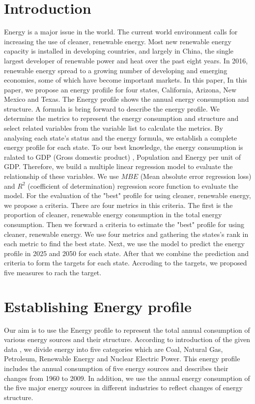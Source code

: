\documentclass{mcmthesis}
\begin{document}
\section{Introduction}
Energy is a major issue in the world. The current world environment calls for increasing the use of cleaner, renewable energy.
Most new renewable energy capacity is installed in developing
countries, and largely in China, the single largest developer of
renewable power and heat over the past eight years. In 2016,
renewable energy spread to a growing number of developing and
emerging economies, some of which have become important
markets.
In this paper, In this paper, we propose an energy profiile for four states, California, Arizona, New Mexico and Texas. The Energy profile shows the annual energy consumption and structure.
A formula is bring forward to describe the energy profile. We determine the metrics to represent the energy consumption and structure and select related variables from the variable list to calculate the metrics.
By analysing each state's status and the energy formula, we establish a complete energy profile for each state.
To our best knowledge, the energy consumption is ralated to
GDP (Gross domestic product) , Population and Energy per unit of GDP. Therefore, we build a multiple linear regression model to evaluate the relationship of these variables.
We use $MBE$ (Mean absolute error regression loss) and $R^2$ (coefficient of determination) regression score function to evaluate the model.
For the evaluation of the "best" profile for using cleaner, renewable energy, we propose a criteria. There are four metrics in this criteria. The first is the proportion of cleaner, renewable energy consumption in the total energy consumption.
Then we forward a criteria to estimate the "best" profile for using cleaner, renewable energy.
We use four metrics and gathering the states's rank in each metric to find the best state.
Next, we use the model to predict the energy profile in 2025 and 2050 for each state. After that we combine the prediction and criteria to form the targets for each state.
Accroding to the targets, we proposed five measures to rach the target.
\section{Establishing Energy profile}
Our aim is to use the Energy profile to represent the total annual consumption of various energy
sources and their structure. According to introduction of the given data \cite{1},
we divide energy into five categories which are Coal, Natural Gas, Petroleum, Renewable Energy and Nuclear Electric Power.
This energy profile includes the annual consumption of five energy sources and describes their changes from 1960 to 2009.
In addition, we use the annual energy consumption of the five major energy sources
in different industries to reflect changes of energy structure.
\end{document}
